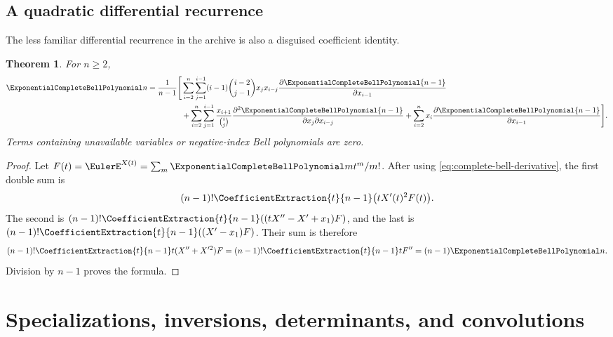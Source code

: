 \documentclass[11pt,a4paper,oneside,openany]{book}
\newtheorem{theorem}{Theorem}[chapter]
\theoremstyle{definition}
\theoremstyle{remark}
\begin{document}
\section{A quadratic differential recurrence}
The less familiar differential recurrence in the archive is also a disguised
coefficient identity.
\begin{theorem}\label{thm:bell-quadratic-differential}
For $n\ge2$,
\begin{align}
 \ExponentialCompleteBellPolynomial n=\frac1{n-1}\Bigg[&
 \sum_{i=2}^{n}\sum_{j=1}^{i-1}(i-1)\binom{i-2}{j-1}x_jx_{i-j}
       \frac{\partial\ExponentialCompleteBellPolynomial{n-1}}{\partial x_{i-1}}\notag\\
 &+\sum_{i=2}^{n}\sum_{j=1}^{i-1}\frac{x_{i+1}}{\binom ij}
       \frac{\partial^2\ExponentialCompleteBellPolynomial{n-1}}{\partial x_j\partial x_{i-j}}
 +\sum_{i=2}^{n}x_i\frac{\partial\ExponentialCompleteBellPolynomial{n-1}}{\partial x_{i-1}}
 \Bigg].
 \label{eq:bell-quadratic-differential}
\end{align}
Terms containing unavailable variables or negative-index Bell polynomials are zero.
\end{theorem}
\begin{proof}
Let $F(t)=\EulerE^{X(t)}=\sum_m\ExponentialCompleteBellPolynomial m t^m/m!$.  After using
\eqref{eq:complete-bell-derivative}, the first double sum is
\[
 (n-1)!\CoefficientExtraction{t}{n-1}\bigl(tX'(t)^2F(t)\bigr).
\]
The second is
$(n-1)!\CoefficientExtraction{t}{n-1}((tX''-X'+x_1)F)$, and the last is
$(n-1)!\CoefficientExtraction{t}{n-1}((X'-x_1)F)$.  Their sum is therefore
\[
 (n-1)!\CoefficientExtraction{t}{n-1}t(X''+X'^2)F
 =(n-1)!\CoefficientExtraction{t}{n-1}tF''=(n-1)\ExponentialCompleteBellPolynomial n.
\]
Division by $n-1$ proves the formula.
\end{proof}

\chapter{Specializations, inversions, determinants, and convolutions}
\end{document}
